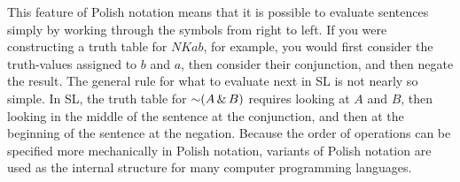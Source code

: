 This feature of Polish notation means that it is possible to evaluate sentences simply by working through the symbols from right to left. If you were constructing a truth table for $NKab$, for example, you would first consider the truth-values assigned to $b$ and $a$, then consider their conjunction, and then negate the result. The general rule for what to evaluate next in SL is not nearly so simple. In SL, the truth table for $\enot(A\eand B)$ requires looking at $A$ and $B$, then looking in the middle of the sentence at the conjunction, and then at the beginning of the sentence at the negation. Because the order of operations can be specified more mechanically in Polish notation, variants of Polish notation are used as the internal structure for many computer programming languages.


